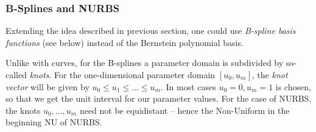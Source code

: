 \subsubsection{B-Splines and NURBS}
Extending the idea described in previous section, one could use \emph{B-spline basis functions} (see below) instead of the Bernstein polynomial basis.

Unlike with \Bez curves, for the B-splines a parameter domain is subdivided by so-called \textit{knots}. For the one-dimensional parameter domain $[u_{0}, u_{m}]$, the \textit{knot vector} will be given by $u_{0} \leq u_{1} \leq ... \leq u_{m}$. In most cases $u_{0} = 0, u_{m} = 1$ is chosen, so that we get the unit interval for our parameter values. For the case of NURBS, the knots $u_{0},..., u_{m}$ need not be equidistant -- hence the Non-Uniform in the beginning NU of NURBS.

